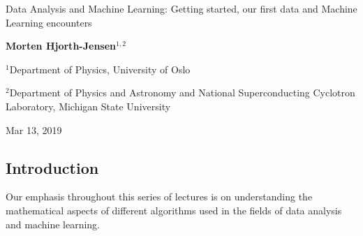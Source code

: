 \documentclass[%
oneside,                 %
final,                   %
10pt]{article}
\begin{document}

\newcommand{\exercisesection}[1]{\subsection*{#1}}






\thispagestyle{empty}

\begin{center}
{\LARGE\bf
\begin{spacing}{1.25}
Data Analysis and Machine Learning: Getting started, our first data and Machine Learning encounters
\end{spacing}
}
\end{center}


\begin{center}
{\bf Morten Hjorth-Jensen${}^{1, 2}$} \\ [0mm]
\end{center}

\begin{center}
\centerline{{\small ${}^1$Department of Physics, University of Oslo}}
\centerline{{\small ${}^2$Department of Physics and Astronomy and National Superconducting Cyclotron Laboratory, Michigan State University}}
\end{center}
    

\begin{center}
Mar 13, 2019
\end{center}

\vspace{1cm}


\subsection{Introduction}

Our emphasis throughout this series of lectures  
is on understanding the mathematical aspects of
different algorithms used in the fields of data analysis and machine learning. 
\end{document}
